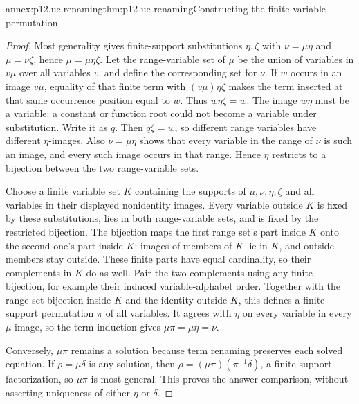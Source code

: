 \begin{annexitem}{annex:p12.ue.renaming}{thm:p12-ue-renaming}{Constructing the finite variable permutation}
\begin{proof}
Most generality gives finite-support substitutions \(\eta,\zeta\)
with \(\nu=\mu\eta\) and \(\mu=\nu\zeta\), hence
\(\mu=\mu\eta\zeta\). Let the range-variable set of \(\mu\)
be the union of variables in \(v\mu\) over all variables \(v\),
and define the corresponding set for \(\nu\).
If \(w\) occurs in an image \(v\mu\), equality of that finite
term with \((v\mu)\eta\zeta\) makes the term inserted at that
same occurrence position equal to \(w\). Thus \(w\eta\zeta=w\).
The image \(w\eta\) must be a variable: a constant or function
root could not become a variable under substitution. Write it as \(q\).
Then \(q\zeta=w\), so different range variables have different
\(\eta\)-images. Also \(\nu=\mu\eta\) shows that every variable
in the range of \(\nu\) is such an image, and every such image occurs
in that range. Hence \(\eta\) restricts to a bijection between the
two range-variable sets.

Choose a finite variable set \(K\) containing the supports of
\(\mu,\nu,\eta,\zeta\) and all variables in their displayed
nonidentity images. Every variable outside \(K\) is fixed by these
substitutions, lies in both range-variable sets, and is fixed by the
restricted bijection. The bijection maps the first range set's part
inside \(K\) onto the second one's part inside \(K\): images of
members of \(K\) lie in \(K\), and outside members stay outside.
These finite parts have equal cardinality, so their complements in
\(K\) do as well. Pair the two complements using any finite bijection,
for example their induced variable-alphabet order. Together with the
range-set bijection inside \(K\) and the identity outside \(K\),
this defines a finite-support permutation \(\pi\) of all variables.
It agrees with \(\eta\) on every variable in every \(\mu\)-image,
so the term induction gives \(\mu\pi=\mu\eta=\nu\).

Conversely, \(\mu\pi\) remains a solution because term renaming
preserves each solved equation. If \(\rho=\mu\delta\) is any
solution, then \(\rho=(\mu\pi)(\pi^{-1}\delta)\), a finite-support
factorization, so \(\mu\pi\) is most general. This proves the
answer comparison, without asserting uniqueness of either \(\eta\)
or \(\delta\).
\end{proof}
\end{annexitem}


